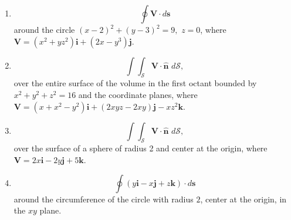 \documentclass[fleqn]{article}
\begin{document}
\begin{enumerate}
\begin{enumerate}
        \item
        \[
        \oint \mathbf{V\cdot }d\mathbf{s}
        \]
        around the circle $\left( x-2\right) ^{2}+\left( y-3\right) ^{2}=9,$ $z=0$, where $\mathbf{V}=\left( x^{2}+yz^{2}\right) \mathbf{i}+\left(2x-y^{3}\right) \mathbf{j}$.
        
        \item
        \[
        \int \! \int_{\mathcal{S}}\mathbf{V\cdot \hat{n}}\,\,d\mathcal{S},
        \]
        over the entire surface of the volume in the first octant bounded by $
        x^{2}+y^{2}+z^{2}=16$ and the coordinate planes, where $\mathbf{V}=\left(x+x^{2}-y^{2}\right) \mathbf{i}+\left( 2xyz-2xy\right) \mathbf{j}-xz^{2}\mathbf{k}$.
        
        \item
        \[
        \int \! \int_{\mathcal{S}}\mathbf{V\cdot \hat{n}}\,\,d\mathcal{S},
        \]
        over the surface of a sphere of radius 2 and center at the origin, where $\mathbf{V}=2x\mathbf{i}-2y\mathbf{j}+5\mathbf{k}$.
        
        \item
        \[ \oint \left( y\mathbf{i}-x\mathbf{j}+z \mathbf{k}\right) \cdot d\mathbf{s}
        \]
        around the circumference of the circle with radius $2$, center at the
        origin, in the $xy$ plane.
      \end{enumerate}
    
    
    
    
    
    
  \end{enumerate}
\end{document}
